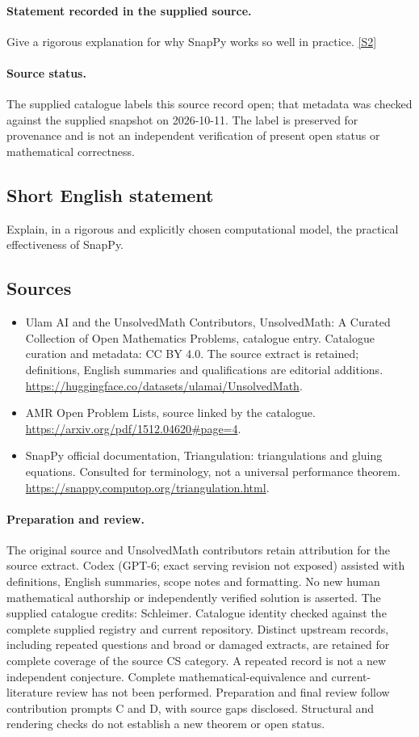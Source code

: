 \documentclass[11pt]{article}
\begin{document}
\paragraph{Statement recorded in the supplied source.}
Give a rigorous explanation for why SnapPy works so well in practice. \href{https://arxiv.org/pdf/1512.04620#page=4}{[S2]}
\paragraph{Source status.}
The supplied catalogue labels this source record open; that metadata was checked against the supplied snapshot on 2026-10-11. The label is preserved for provenance and is not an independent verification of present open status or mathematical correctness.
\subsection{Short English statement}
Explain, in a rigorous and explicitly chosen computational model, the practical effectiveness of SnapPy.
\subsection{Sources}
\begin{itemize}
\item[S1] Ulam AI and the UnsolvedMath Contributors, UnsolvedMath: A Curated Collection of Open Mathematics Problems, catalogue entry. Catalogue curation and metadata: CC BY 4.0. The source extract is retained; definitions, English summaries and qualifications are editorial additions.
\url{https://huggingface.co/datasets/ulamai/UnsolvedMath}.
\item[S2] AMR Open Problem Lists, source linked by the catalogue.
\url{https://arxiv.org/pdf/1512.04620#page=4}.
\item[S3] SnapPy official documentation, Triangulation: triangulations and gluing equations. Consulted for terminology, not a universal performance theorem.
\url{https://snappy.computop.org/triangulation.html}.
\end{itemize}
\paragraph{Preparation and review.}
The original source and UnsolvedMath contributors retain attribution for the source extract. Codex (GPT-6; exact serving revision not exposed) assisted with definitions, English summaries, scope notes and formatting. No new human mathematical authorship or independently verified solution is asserted. The supplied catalogue credits: Schleimer. Catalogue identity checked against the complete supplied registry and current repository. Distinct upstream records, including repeated questions and broad or damaged extracts, are retained for complete coverage of the source CS category. A repeated record is not a new independent conjecture. Complete mathematical-equivalence and current-literature review has not been performed. Preparation and final review follow contribution prompts C and D, with source gaps disclosed. Structural and rendering checks do not establish a new theorem or open status.
\label{end:statement}
\end{document}
